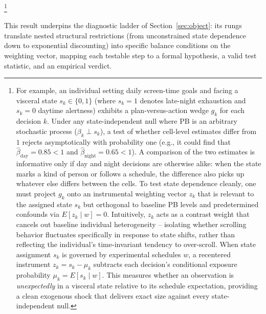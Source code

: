 \documentclass[11pt,a4paper]{article}
\theoremstyle{plain}
\theoremstyle{definition}
\begin{document}
\footnote{For example, an individual setting daily screen-time goals and facing a visceral state $s_k \in \{0,1\}$ (where $s_k=1$ denotes late-night exhaustion and $s_k=0$ daytime alertness) exhibits a plan-versus-action wedge $g_k$ %
for each decision $k$. 
Under any state-independent null where PB is an arbitrary stochastic process ($\beta_k \perp s_k$), a test of whether cell-level estimates differ from $1$ rejects asymptotically with probability one (e.g., it could find that $\hat{\beta}_{\text{day}} = 0.85 < 1$ and $\hat{\beta}_{\text{night}} = 0.65 < 1$).
A comparison of the two estimates is informative only if day and night decisions are otherwise alike: when the state marks a kind of person or follows a schedule, the difference also picks up whatever else differs between the cells. %
To test state dependence cleanly, one must project $g_k$ onto an instrumental weighting vector $z_k$ that is relevant to the assigned state $s_k$ but orthogonal to baseline PB levels and predetermined confounds via $E[z_k \mid w] = 0$. Intuitively, $z_k$ acts as a contrast weight that cancels out baseline individual heterogeneity -- isolating whether scrolling behavior fluctuates specifically in response to state shifts, rather than reflecting the individual's time-invariant tendency to over-scroll.
When state assignment $s_k$ is governed by experimental schedules $w$, a recentered instrument $z_k = s_k - \mu_k$ subtracts each decision's conditional exposure probability $\mu_k = E[s_k \mid w]$. This measures whether an observation is \emph{unexpectedly} in a visceral state relative to its schedule expectation, providing a clean exogenous shock that delivers exact size 
against every state-independent null.
}

This result underpins the diagnostic ladder of Section~\ref{sec:object}: its rungs translate nested structural restrictions (from unconstrained state dependence down to exponential discounting) into specific balance conditions on the weighting vector, mapping each testable step to a formal hypothesis, a valid test statistic, and an empirical verdict.
\end{document}
